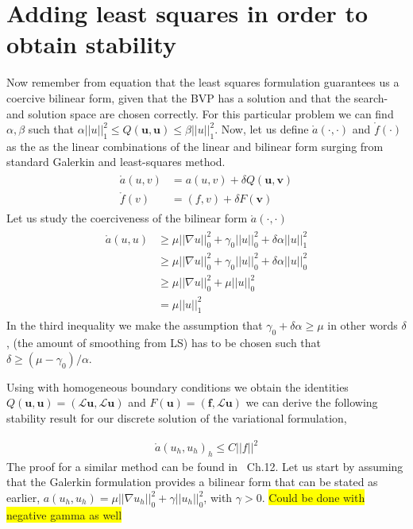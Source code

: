 \section{Adding least squares in order to obtain stability}

Now remember from equation  that the least squares formulation guarantees us a coercive bilinear form, given that the BVP has a solution and that the search- and solution space are chosen correctly. For this particular problem we can find $\alpha,\beta$ such that $\alpha||u||_1^2 \leq Q(\mathbf{u},\mathbf{u}) \leq \beta||u||_1^2 $.
Now, let us define $\mathring{a}(\cdot,\cdot)$ and $\mathring{f}(\cdot)$ as the as the linear combinations of the linear and bilinear form surging from standard Galerkin and least-squares method. 
\begin{align}
	\begin{split}
	\mathring{a}(u,v) &= a(u,v) + \delta Q(\mathbf{u},\mathbf{\mathbf{v}}) \\
	 \mathring{f}(v) &= (f,v) + \delta F(\mathbf{\mathbf{v}}) 
	\end{split}
	\label{eq:GLS}
\end{align}
Let us study the coerciveness of the bilinear form $\mathring{a}(\cdot,\cdot)$
\begin{align}
	\begin{split}
	\mathring{a}(u,u) &\geq \mu ||\nabla u||_0^2+\gamma_0||u||_0^2+\delta \alpha ||u||^2_1 \\
	&\geq \mu ||\nabla u||_0^2+\gamma_0||u||_0^2+\delta \alpha ||u||^2_0 \\
	&\geq \mu ||\nabla u||_0^2+\mu ||u||_0^2 \\
	&= \mu ||u||^2_1
	\end{split}
	\label{eq:coercivity}
\end{align}
In the third inequality we make the assumption that $\gamma_0+\delta \alpha \geq \mu $ in other words $\delta$, (the amount of smoothing from LS) has to be chosen such that $\delta \geq (\mu-\gamma_0)/\alpha$.

Using  with homogeneous boundary conditions we obtain the identities $Q(\mathbf{u},\mathbf{u}) = (\mathcal{L}\mathbf{u},\mathcal{L}\mathbf{u})$ and $F(\mathbf{u}) = (\mathbf{f},\mathcal{L}\mathbf{u})$ we can derive the following stability result for our discrete solution of the variational formulation, 
	
\begin{align}
	\mathring{a}(u_h,u_h)_h \leq C ||f||^2
	\label{eq:stabilityResult}
\end{align}
The proof for a similar method can be found in~\cite{Quarteroni} Ch.12. 
Let us start by assuming that the Galerkin formulation provides a bilinear form that can be stated as earlier, $a(u_h,u_h)= \mu||\nabla u_h||^2_0 + \gamma||u_h||^2_0$, with $\gamma > 0$. 
\colorbox{yellow}{Could be done with negative gamma as well }

